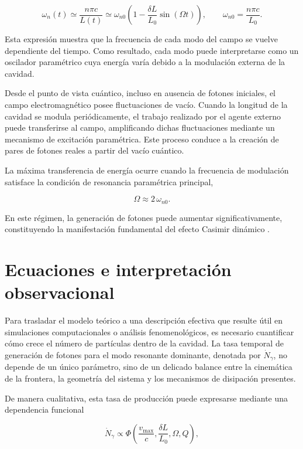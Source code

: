 \documentclass[11pt,a4paper]{article}
\begin{document}
\begin{equation}
\omega_n(t)\simeq \frac{n\pi c}{L(t)}
\simeq
\omega_{n0}
\left(
1-\frac{\delta L}{L_0}\sin(\Omega t)
\right),
\qquad
\omega_{n0}=\frac{n\pi c}{L_0}.
\end{equation}

Esta expresión muestra que la frecuencia de cada modo del campo se vuelve dependiente del tiempo. Como resultado, cada modo puede interpretarse como un oscilador paramétrico cuya energía varía debido a la modulación externa de la cavidad.

Desde el punto de vista cuántico, incluso en ausencia de fotones iniciales, el campo electromagnético posee fluctuaciones de vacío. Cuando la longitud de la cavidad se modula periódicamente, el trabajo realizado por el agente externo puede transferirse al campo, amplificando dichas fluctuaciones mediante un mecanismo de excitación paramétrica. Este proceso conduce a la creación de pares de fotones reales a partir del vacío cuántico.

La máxima transferencia de energía ocurre cuando la frecuencia de modulación satisface la condición de resonancia paramétrica principal,

\begin{equation}
\Omega \approx 2\,\omega_{n0}.
\end{equation}

En este régimen, la generación de fotones puede aumentar significativamente, constituyendo la manifestación fundamental del efecto Casimir dinámico \cite{law1994,dodonov2010}.

\section{Ecuaciones e interpretación observacional}

Para trasladar el modelo teórico a una descripción efectiva que resulte útil en simulaciones computacionales o análisis fenomenológicos, es necesario cuantificar cómo crece el número de partículas dentro de la cavidad. La tasa temporal de generación de fotones para el modo resonante dominante, denotada por $\dot N_{\gamma}$, no depende de un único parámetro, sino de un delicado balance entre la cinemática de la frontera, la geometría del sistema y los mecanismos de disipación presentes.

De manera cualitativa, esta tasa de producción puede expresarse mediante una dependencia funcional

\begin{equation}
\dot N_{\gamma}
\propto
\Phi
\left(
\frac{v_{\max}}{c},
\frac{\delta L}{L_0},
\Omega,
Q
\right),
\end{equation}
\end{document}
